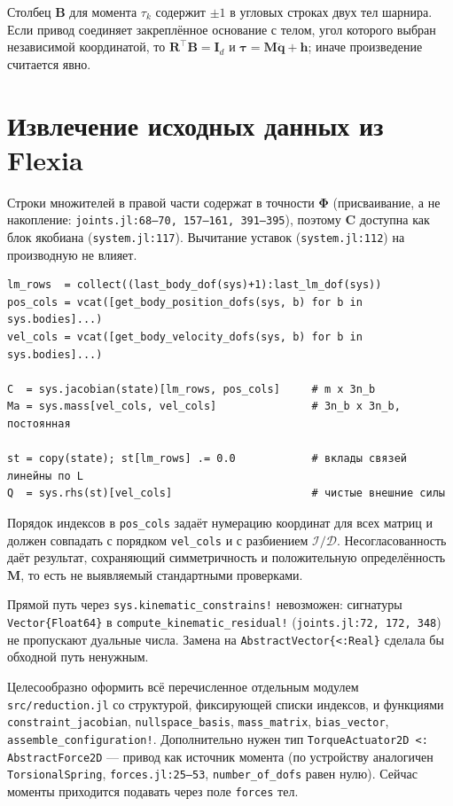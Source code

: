 \documentclass[11pt,a4paper]{article}
\newcommand{\bq}{\mathbf{q}}
\newcommand{\bC}{\mathbf{C}}
\newcommand{\bR}{\mathbf{R}}
\newcommand{\bM}{\mathbf{M}}
\newcommand{\bB}{\mathbf{B}}
\newcommand{\bI}{\mathbf{I}}
\newcommand{\bh}{\mathbf{h}}
\newcommand{\bPhi}{\boldsymbol{\Phi}}
\newcommand{\btau}{\boldsymbol{\tau}}
\newcommand{\tr}{^{\!\top}}
\newcommand{\code}[1]{\texttt{#1}}
\begin{document}
Столбец $\bB$ для момента $\tau_k$ содержит $\pm1$ в угловых строках двух тел
шарнира. Если привод соединяет закреплённое основание с телом, угол которого
выбран независимой координатой, то $\bR\tr\bB=\bI_d$ и
$\btau=\bM\ddot{\bq}+\bh$; иначе произведение считается явно.

\section{Извлечение исходных данных из Flexia}

Строки множителей в правой части содержат в точности $\bPhi$ (присваивание, а
не накопление: \code{joints.jl:68–70, 157–161, 391–395}), поэтому $\bC$
доступна как блок якобиана (\code{system.jl:117}). Вычитание уставок
(\code{system.jl:112}) на производную не влияет.

\begin{lstlisting}
lm_rows  = collect((last_body_dof(sys)+1):last_lm_dof(sys))
pos_cols = vcat([get_body_position_dofs(sys, b) for b in sys.bodies]...)
vel_cols = vcat([get_body_velocity_dofs(sys, b) for b in sys.bodies]...)

C  = sys.jacobian(state)[lm_rows, pos_cols]     # m x 3n_b
Ma = sys.mass[vel_cols, vel_cols]               # 3n_b x 3n_b, постоянная

st = copy(state); st[lm_rows] .= 0.0            # вклады связей линейны по L
Q  = sys.rhs(st)[vel_cols]                      # чистые внешние силы
\end{lstlisting}

Порядок индексов в \code{pos\_cols} задаёт нумерацию координат для всех
матриц и должен совпадать с порядком \code{vel\_cols} и с разбиением
$\mathcal I/\mathcal D$. Несогласованность даёт результат, сохраняющий
симметричность и положительную определённость $\bM$, то есть не выявляемый
стандартными проверками.

Прямой путь через \code{sys.kinematic\_constrains!} невозможен: сигнатуры
\code{Vector\{Float64\}} в \code{compute\_kinematic\_residual!}
(\code{joints.jl:72, 172, 348}) не пропускают дуальные числа. Замена на
\code{AbstractVector\{<:Real\}} сделала бы обходной путь ненужным.

Целесообразно оформить всё перечисленное отдельным модулем
\code{src/reduction.jl} со структурой, фиксирующей списки индексов, и
функциями \code{constraint\_jacobian}, \code{nullspace\_basis},
\code{mass\_matrix}, \code{bias\_vector}, \code{assemble\_configuration!}.
Дополнительно нужен тип \code{TorqueActuator2D <: AbstractForce2D} --- привод
как источник момента (по устройству аналогичен \code{TorsionalSpring},
\code{forces.jl:25–53}, \code{number\_of\_dofs} равен нулю). Сейчас моменты
приходится подавать через поле \code{forces} тел.
\end{document}

